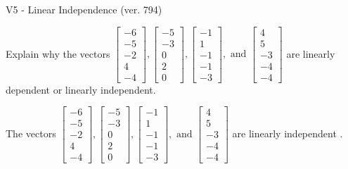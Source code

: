 \begin{exercise}
  \begin{exerciseTitle}V5 - Linear Independence (ver. 794)\end{exerciseTitle}
  \begin{exerciseStatement}
    Explain why the vectors \(\left[\begin{array}{r}
-6 \\
-5 \\
-2 \\
4 \\
-4
\end{array}\right] , \left[\begin{array}{r}
-5 \\
-3 \\
0 \\
2 \\
0
\end{array}\right] , \left[\begin{array}{r}
-1 \\
1 \\
-1 \\
-1 \\
-3
\end{array}\right] , \text{ and } \left[\begin{array}{r}
4 \\
5 \\
-3 \\
-4 \\
-4
\end{array}\right]\) are linearly dependent or linearly independent.	


  \end{exerciseStatement}
  \begin{exerciseAnswer}
   The vectors \(\left[\begin{array}{r}
-6 \\
-5 \\
-2 \\
4 \\
-4
\end{array}\right] , \left[\begin{array}{r}
-5 \\
-3 \\
0 \\
2 \\
0
\end{array}\right] , \left[\begin{array}{r}
-1 \\
1 \\
-1 \\
-1 \\
-3
\end{array}\right] , \text{ and } \left[\begin{array}{r}
4 \\
5 \\
-3 \\
-4 \\
-4
\end{array}\right]\) are 
  	 linearly independent  .
  


  \end{exerciseAnswer}
\end{exercise}